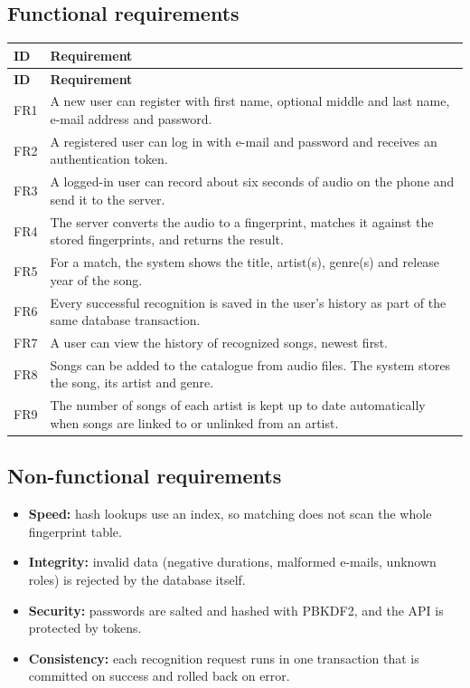 \documentclass[11pt,a4paper]{article}
\begin{document}
\subsection{Functional requirements}


\begin{longtable}{|p{1.5cm}|p{14cm}|}
\hline
\textbf{ID} & \textbf{Requirement} \\
\hline
\endfirsthead

\hline
\textbf{ID} & \textbf{Requirement} \\
\hline
\endhead

FR1 & A new user can register with first name, optional middle and last name, e-mail address and password. \\
\hline
FR2 & A registered user can log in with e-mail and password and receives an authentication token. \\
\hline
FR3 & A logged-in user can record about six seconds of audio on the phone and send it to the server. \\
\hline
FR4 & The server converts the audio to a fingerprint, matches it against the stored fingerprints, and returns the result. \\
\hline
FR5 & For a match, the system shows the title, artist(s), genre(s) and release year of the song. \\
\hline
FR6 & Every successful recognition is saved in the user's history as part of the same database transaction. \\
\hline
FR7 & A user can view the history of recognized songs, newest first. \\
\hline
FR8 & Songs can be added to the catalogue from audio files. The system stores the song, its artist and genre. \\
\hline
FR9 & The number of songs of each artist is kept up to date automatically when songs are linked to or unlinked from an artist. \\

\bottomrule
\end{longtable}

\subsection{Non-functional requirements}

\begin{itemize}
  \item \textbf{Speed:} hash lookups use an index, so matching does not scan the whole fingerprint table.
  \item \textbf{Integrity:} invalid data (negative durations, malformed e-mails, unknown roles) is rejected by the database itself.
  \item \textbf{Security:} passwords are salted and hashed with PBKDF2, and the API is protected by tokens.
  \item \textbf{Consistency:} each recognition request runs in one transaction that is committed on success and rolled back on error.
\end{itemize}
\end{document}
